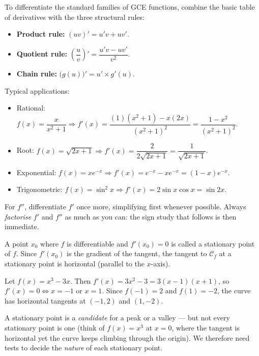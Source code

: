 \documentclass[11pt]{article}
\newcommand{\cle}[1]{{\popxbold\color{popdark}#1}}
\newcounter{popsec}
\newcounter{popsub}
\newcommand{\courssub}[1]{%
  \stepcounter{popsub}%
  \par\vspace{9pt}\noindent{\popxbold\fontsize{11.5}{13}\selectfont\color{popink}{\color{poporange}\thepopsec.\thepopsub}\hspace{6pt}#1}\par\nopagebreak\vspace{4pt}
}
\begin{document}
\begin{methode}
To differentiate the standard families of GCE functions, combine the basic table of derivatives with the three structural rules:
\begin{itemize}
\item \textbf{Product rule:} $(uv)' = u'v + uv'$.
\item \textbf{Quotient rule:} $\left(\dfrac{u}{v}\right)' = \dfrac{u'v - uv'}{v^2}$.
\item \textbf{Chain rule:} $\bigl(g(u)\bigr)' = u' \times g'(u)$.
\end{itemize}
Typical applications:
\begin{itemize}
\item Rational: $f(x)=\dfrac{x}{x^2+1} \Rightarrow f'(x)=\dfrac{(1)(x^2+1)-x(2x)}{(x^2+1)^2}=\dfrac{1-x^2}{(x^2+1)^2}$.
\item Root: $f(x)=\sqrt{2x+1} \Rightarrow f'(x)=\dfrac{2}{2\sqrt{2x+1}}=\dfrac{1}{\sqrt{2x+1}}$.
\item Exponential: $f(x)=xe^{-x} \Rightarrow f'(x)=e^{-x}-xe^{-x}=(1-x)e^{-x}$.
\item Trigonometric: $f(x)=\sin^2 x \Rightarrow f'(x)=2\sin x \cos x = \sin 2x$.
\end{itemize}
For $f''$, differentiate $f'$ once more, simplifying first whenever possible. Always \emph{factorise} $f'$ and $f''$ as much as you can: the sign study that follows is then immediate.
\end{methode}

\courssub{Stationary Points}

\begin{definition}
A point $x_0$ where $f$ is differentiable and $f'(x_0)=0$ is called a \cle{stationary point} of $f$. Since $f'(x_0)$ is the gradient of the tangent, the tangent to $\mathcal{C}_f$ at a stationary point is \cle{horizontal} (parallel to the $x$-axis).
\end{definition}

\begin{exemplebox}
Let $f(x)=x^3-3x$. Then $f'(x)=3x^2-3=3(x-1)(x+1)$, so $f'(x)=0 \iff x=-1$ or $x=1$. Since $f(-1)=2$ and $f(1)=-2$, the curve has horizontal tangents at $(-1,2)$ and $(1,-2)$.
\end{exemplebox}

A stationary point is a \emph{candidate} for a peak or a valley --- but not every stationary point is one (think of $f(x)=x^3$ at $x=0$, where the tangent is horizontal yet the curve keeps climbing through the origin). We therefore need tests to decide the \emph{nature} of each stationary point.
\end{document}
